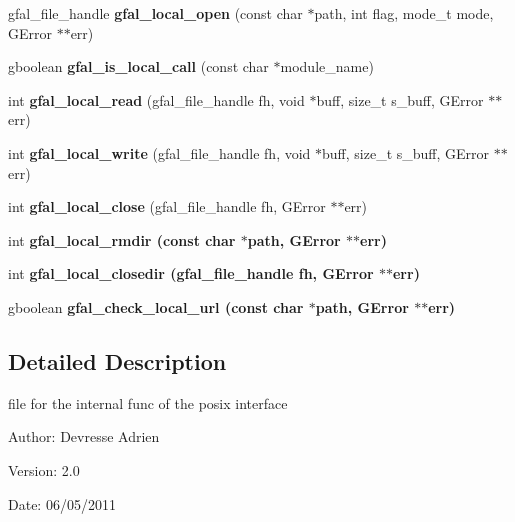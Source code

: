 \begin{CompactItemize}
\item 
gfal\_\-file\_\-handle \textbf{gfal\_\-local\_\-open} (const char $\ast$path, int flag, mode\_\-t mode, GError $\ast$$\ast$err)\label{gfal__posix__local__file_8c_b596322ecc96fdc80c6c21802483f1d4}

\item 
gboolean \textbf{gfal\_\-is\_\-local\_\-call} (const char $\ast$module\_\-name)\label{gfal__posix__local__file_8c_41bf6452e794fbfd86b1cfd95fe61f5b}

\item 
int \textbf{gfal\_\-local\_\-read} (gfal\_\-file\_\-handle fh, void $\ast$buff, size\_\-t s\_\-buff, GError $\ast$$\ast$err)\label{gfal__posix__local__file_8c_45d46420d93abbaa7bbeb345bd8a6584}

\item 
int \textbf{gfal\_\-local\_\-write} (gfal\_\-file\_\-handle fh, void $\ast$buff, size\_\-t s\_\-buff, GError $\ast$$\ast$err)\label{gfal__posix__local__file_8c_b9335b2236704108f4492032685d5ba2}

\item 
int \textbf{gfal\_\-local\_\-close} (gfal\_\-file\_\-handle fh, GError $\ast$$\ast$err)\label{gfal__posix__local__file_8c_145bf9e9edbe0321103e13a665c08d8a}

\item 
int \bf{gfal\_\-local\_\-rmdir} (const char $\ast$path, GError $\ast$$\ast$err)
\item 
int \bf{gfal\_\-local\_\-closedir} (gfal\_\-file\_\-handle fh, GError $\ast$$\ast$err)
\item 
gboolean \bf{gfal\_\-check\_\-local\_\-url} (const char $\ast$path, GError $\ast$$\ast$err)
\end{CompactItemize}


\subsection{Detailed Description}
file for the internal func of the posix interface 

\begin{Desc}
\item[Author:]Devresse Adrien \end{Desc}
\begin{Desc}
\item[Version:]2.0 \end{Desc}
\begin{Desc}
\item[Date:]06/05/2011 \end{Desc}


